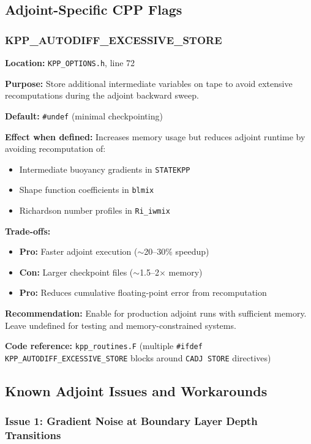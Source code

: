 \documentclass[12pt,letterpaper]{article}
\begin{document}
\subsection{Adjoint-Specific CPP Flags}

\subsubsection{KPP\_AUTODIFF\_EXCESSIVE\_STORE}

\textbf{Location:} \texttt{KPP\_OPTIONS.h}, line 72

\textbf{Purpose:} Store additional intermediate variables on tape to avoid
extensive recomputations during the adjoint backward sweep.

\textbf{Default:} \texttt{\#undef} (minimal checkpointing)

\textbf{Effect when defined:} Increases memory usage but reduces adjoint runtime
by avoiding recomputation of:
\begin{itemize}[leftmargin=*]
  \item Intermediate buoyancy gradients in \texttt{STATEKPP}
  \item Shape function coefficients in \texttt{blmix}
  \item Richardson number profiles in \texttt{Ri\_iwmix}
\end{itemize}

\textbf{Trade-offs:}
\begin{itemize}[leftmargin=*]
  \item \textbf{Pro:} Faster adjoint execution ($\sim$20--30\% speedup)
  \item \textbf{Con:} Larger checkpoint files ($\sim$1.5--2$\times$ memory)
  \item \textbf{Pro:} Reduces cumulative floating-point error from recomputation
\end{itemize}

\textbf{Recommendation:} Enable for production adjoint runs with sufficient memory.
Leave undefined for testing and memory-constrained systems.

\textbf{Code reference:} \texttt{kpp\_routines.F} (multiple \texttt{\#ifdef
KPP\_AUTODIFF\_EXCESSIVE\_STORE} blocks around \texttt{CADJ STORE} directives)

\subsection{Known Adjoint Issues and Workarounds}

\subsubsection{Issue 1: Gradient Noise at Boundary Layer Depth Transitions}
\end{document}
